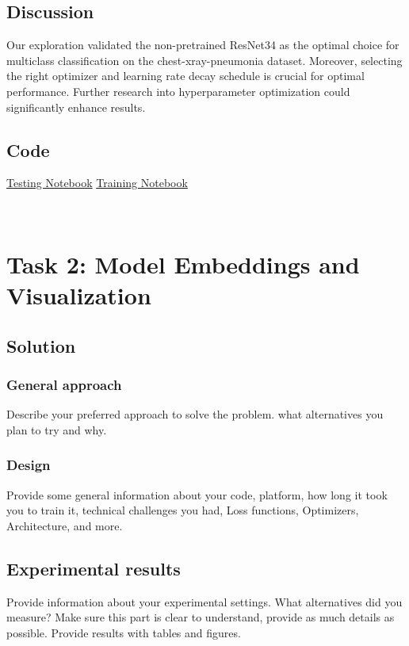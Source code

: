 \documentclass{article}
\begin{document}
\subsection{Discussion}
Our exploration validated the non-pretrained ResNet34 as the optimal choice for multiclass classification on the chest-xray-pneumonia dataset. Moreover, selecting the right optimizer and learning rate decay schedule is crucial for optimal performance. Further research into hyperparameter optimization could significantly enhance results.

\subsection{Code}

\href{https://colab.research.google.com/drive/1FQ7bfbL8da7DRQiRvmgwdZXTTDB8sq8w}{Testing Notebook}
\href{https://colab.research.google.com/drive/157ERSNs66ypq-Svs68ftGqOEB_q_hAXD#scrollTo=ORtu8MojEoMq}{Training Notebook}


\
\section{Task 2: Model Embeddings and Visualization}

\subsection{Solution}
\subsubsection{General approach}
Describe your preferred approach to solve the problem. what alternatives you plan to try and why. 

\subsubsection{Design}
Provide some general information about your code, platform, how long it took you to train it, technical challenges you had, Loss functions, Optimizers, Architecture, and more.

\subsection{Experimental results}
Provide information about your experimental settings. What alternatives did you measure? Make sure this part is clear to understand, provide as much details as possible. Provide results with tables and figures.
\end{document}

